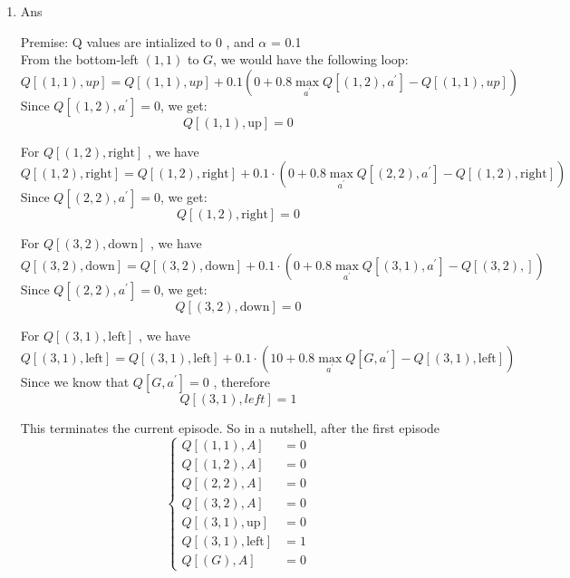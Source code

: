 \documentclass[12pt]{article}
\begin{document}
\begin{enumerate}
\begin{enumerate}
\begin{tcolorbox}
    \end{tcolorbox}
    \item Ans
    \begin{tcolorbox}
        Premise: Q values are intialized to \(0\) , and \(\alpha\) = 0.1\\
        From the bottom-left $(1,1)$ to $G$, we would have the following loop:
$$
Q[(1,1),up] = Q[(1,1), up] + 0.1 (0 + 0.8 \max_{a^{\prime}}Q[(1,2),a^{\prime}] - Q[(1,1),up])
$$
Since $Q[(1,2),a^{\prime}] = 0$, we get:
$$
Q[(1,1), \text{up}] = 0
$$

For $Q[(1,2),\text{right}]$ , we have
$$
Q[(1,2), \text{right}] =Q[(1,2), \text{right}] + 0.1 \cdot (0 + 0.8 \max_{a^{\prime}}Q[(2,2),a^{\prime}] - Q[(1,2), \text{right}])
$$
Since $Q[(2,2), a^{\prime}] = 0$, we get:
$$
Q[(1,2), \text{right}] = 0
$$

For $Q[(3,2),\text{down}]$ , we have
$$
Q[(3,2), \text{down}] =Q[(3,2), \text{down}] + 0.1 \cdot (0 + 0.8 \max_{a^{\prime}}Q[(3,1),a^{\prime}] - Q[(3,2), \text{}])
$$
Since $Q[(2,2), a^{\prime}] = 0$, we get:
$$
Q[(3,2), \text{down}] = 0
$$

For ${} Q[(3,1),\text{left}] {}$ , we have
$$
Q[(3,1), \text{left}] =Q[(3,1), \text{left}] + 0.1 \cdot (10 + 0.8 \max_{a^{\prime}}Q[G,a^{\prime}] - Q[(3,1), \text{left}])
$$
Since we know that $Q[G, a^{\prime}] = 0$ , therefore
$$
Q[(3,1),left] = 1
$$

This terminates the current episode.
So in a nutshell, after the first episode
$$
\begin{cases}
Q[(1,1),A] &= 0 \\
Q[(1,2),A] &= 0 \\
Q[(2,2),A] &= 0 \\
Q[(3,2),A] &= 0 \\
Q[(3,1),\text{up}]&= 0 \\
Q[(3,1),\text{left}]&=1 \\
Q[(G), A] &= 0
\end{cases}
$$

\end{tcolorbox}


\end{enumerate}
\end{enumerate}
\end{document}
